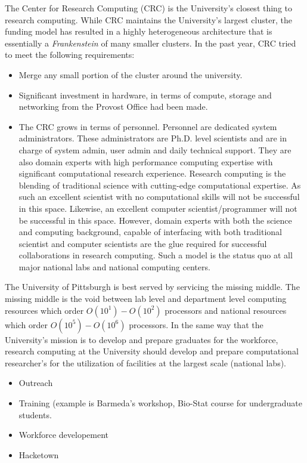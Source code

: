 \documentclass[conference]{IEEEtran}
\begin{document}
The Center for Research Computing (CRC) is the University's closest thing to research computing.
While CRC maintains the University's largest cluster, the
funding model has resulted in a highly heterogeneous architecture that is essentially a {\it Frankenstein} of
many smaller clusters. In the past year, CRC tried to meet the following requirements:

\begin{itemize}

\item Merge any small portion of the cluster around the university. 

\item Significant investment in hardware, in terms of compute, storage and networking from the Provost Office had been made. 

\item The CRC grows in terms of personnel. Personnel are dedicated system administrators. These administrators are Ph.D. level scientists and are in charge of system admin, user admin and daily
technical support. They are also domain experts with high performance computing expertise with significant computational research experience. Research computing is the blending of traditional science with cutting-edge computational expertise. As such an excellent scientist with no computational skills will not
be successful in this space. Likewise, an excellent computer scientist/programmer will not be successful in this space. However, domain experts with both the science and computing background,
capable of interfacing with both traditional scientist and computer scientists are the glue required
for successful collaborations in research computing. Such a model is the status quo at all major
national labs and national computing centers.

\end{itemize}


The University of Pittsburgh is best served by servicing the missing middle. The missing middle is the void
between lab level and department level computing resources which order $O(10^1)-O(10^2)$ processors and national resources which order $O(10^5)-O(10^6)$ processors. In the same way that the
University's mission is to develop and prepare graduates for the workforce, research computing
at the University should develop and prepare computational researcher's for the utilization of
facilities at the largest scale (national labs).

\begin{itemize}
\item Outreach
\item Training (example is Barmeda's workshop, Bio-Stat course for undergraduate students.
\item Workforce developement
\item Hacketown
\end{itemize}
\end{document}

